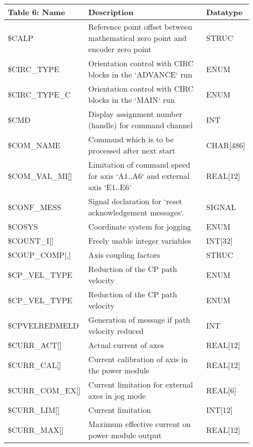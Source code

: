 \begin{appendices}
        \newpage
        \begin{tabular}{|p{}|p{}|p{}|}
        \hline
        \textbf{Table 6: Name} & \textbf{Description} & \textbf{Datatype} \\ \hline
        \$CALP & Reference point offset between mathematical zero point and encoder zero point & STRUC \\ \hline
        \$CIRC\_TYPE & Orientation control with CIRC blocks in the `ADVANCE` run & ENUM \\ \hline
        \$CIRC\_TYPE\_C & Orientation control with CIRC blocks in the `MAIN` run & ENUM \\ \hline
        \$CMD & Display assignment number (handle) for command channel & INT \\ \hline
        \$COM\_NAME & Command which is to be processed after next start & CHAR[486] \\ \hline
        \$COM\_VAL\_MI[] & Limitation of command speed for axis `A1..A6` and external axis `E1..E6` & REAL[12] \\ \hline
        \$CONF\_MESS & Signal declaration for `reset acknowledgement messages`. & SIGNAL \\ \hline
        \$COSYS & Coordinate system for jogging & ENUM \\ \hline
        \$COUNT\_I[] & Freely usable integer variables & INT[32] \\ \hline
        \$COUP\_COMP[,] & Axis coupling factors & STRUC \\ \hline
        \$CP\_VEL\_TYPE & Reduction of the CP path velocity & ENUM \\ \hline
        \$CP\_VEL\_TYPE & Reduction of the CP path velocity & ENUM \\ \hline
        \$CPVELREDMELD & Generation of message if path velocity reduced & INT \\ \hline
        \$CURR\_ACT[] & Actual current of axes & REAL[12] \\ \hline
        \$CURR\_CAL[] & Current calibration of axis in the power module & REAL[12] \\ \hline
        \$CURR\_COM\_EX[] & Current limitation for external axes in jog mode & REAL[6] \\ \hline
        \$CURR\_LIM[] & Current limitation & INT[12] \\ \hline
        \$CURR\_MAX[] & Maximum effective current on power module output & REAL[12] \\ \hline
        \end{tabular}
        

\end{appendices}
